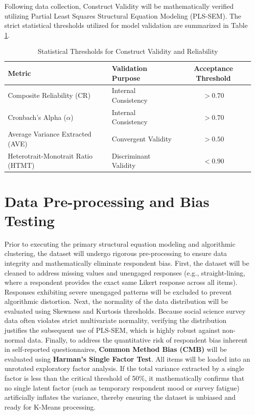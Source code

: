 Following data collection, Construct Validity will be mathematically verified utilizing Partial Least Squares Structural Equation Modeling (PLS-SEM). The strict statistical thresholds utilized for model validation are summarized in Table \ref{tab:validity_thresholds}.

\begin{table}[H]
    \centering
    \linespread{1.5}\selectfont
    \caption{Statistical Thresholds for Construct Validity and Reliability}
    \vspace{0.2cm}
    \begin{tabular}{llc}
        \toprule
        \textbf{Metric} & \textbf{Validation Purpose} & \textbf{Acceptance Threshold} \\
        \midrule
        Composite Reliability (CR) & Internal Consistency & $> 0.70$ \\
        \addlinespace
        Cronbach's Alpha ($\alpha$) & Internal Consistency & $> 0.70$ \\
        \addlinespace
        Average Variance Extracted (AVE) & Convergent Validity & $> 0.50$ \\
        \addlinespace
        Heterotrait-Monotrait Ratio (HTMT) & Discriminant Validity & $< 0.90$ \\
        \bottomrule
    \end{tabular}
    \label{tab:validity_thresholds}
\end{table}

\section{Data Pre-processing and Bias Testing}
Prior to executing the primary structural equation modeling and algorithmic clustering, the dataset will undergo rigorous pre-processing to ensure data integrity and mathematically eliminate respondent bias.
First, the dataset will be cleaned to address missing values and unengaged responses (e.g., straight-lining, where a respondent provides the exact same Likert response across all items). Responses exhibiting severe unengaged patterns will be excluded to prevent algorithmic distortion.
Next, the normality of the data distribution will be evaluated using Skewness and Kurtosis thresholds. Because social science survey data often violates strict multivariate normality, verifying the distribution justifies the subsequent use of PLS-SEM, which is highly robust against non-normal data.
Finally, to address the quantitative risk of respondent bias inherent in self-reported questionnaires, \textbf{Common Method Bias (CMB)} will be evaluated using \textbf{Harman's Single Factor Test}. All items will be loaded into an unrotated exploratory factor analysis. If the total variance extracted by a single factor is less than the critical threshold of 50\%, it mathematically confirms that no single latent factor (such as temporary respondent mood or survey fatigue) artificially inflates the variance, thereby ensuring the dataset is unbiased and ready for K-Means processing.

